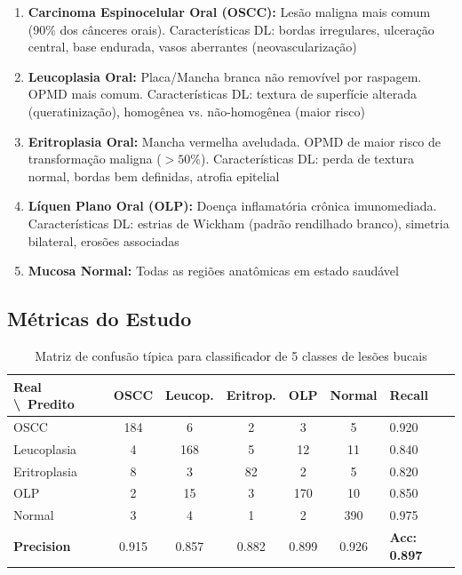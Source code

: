 \begin{enumerate}
  \item \textbf{Carcinoma Espinocelular Oral (OSCC):} Lesão maligna mais comum
        (90\% dos cânceres orais). Características DL: bordas irregulares,
        ulceração central, base endurada, vasos aberrantes (neovascularização)

  \item \textbf{Leucoplasia Oral:} Placa/Mancha branca não removível por raspagem.
        OPMD mais comum. Características DL: textura de superfície alterada
        (queratinização), homogênea vs. não-homogênea (maior risco)

  \item \textbf{Eritroplasia Oral:} Mancha vermelha aveludada. OPMD de maior
        risco de transformação maligna ($> 50\%$). Características DL: perda
        de textura normal, bordas bem definidas, atrofia epitelial

  \item \textbf{Líquen Plano Oral (OLP):} Doença inflamatória crônica
        imunomediada. Características DL: estrias de Wickham (padrão rendilhado
        branco), simetria bilateral, erosões associadas

  \item \textbf{Mucosa Normal:} Todas as regiões anatômicas em estado saudável
\end{enumerate}

\subsection{Métricas do Estudo}

\begin{table}[H]
  \centering
  \caption{Matriz de confusão típica para classificador de 5 classes de lesões bucais}
  \label{tab:confusao-5}
  \begin{tabularx}{\textwidth}{lcccccX}
    \toprule
    \textbf{Real \textbackslash\ Predito} & \textbf{OSCC} & \textbf{Leucop.} & \textbf{Eritrop.} & \textbf{OLP} & \textbf{Normal} & \textbf{Recall} \\
    \midrule
    OSCC & 184 & 6 & 2 & 3 & 5 & 0.920 \\
    Leucoplasia & 4 & 168 & 5 & 12 & 11 & 0.840 \\
    Eritroplasia & 8 & 3 & 82 & 2 & 5 & 0.820 \\
    OLP & 2 & 15 & 3 & 170 & 10 & 0.850 \\
    Normal & 3 & 4 & 1 & 2 & 390 & 0.975 \\
    \midrule
    \textbf{Precision} & 0.915 & 0.857 & 0.882 & 0.899 & 0.926 & \textbf{Acc: 0.897} \\
    \bottomrule
  \end{tabularx}
\end{table}

